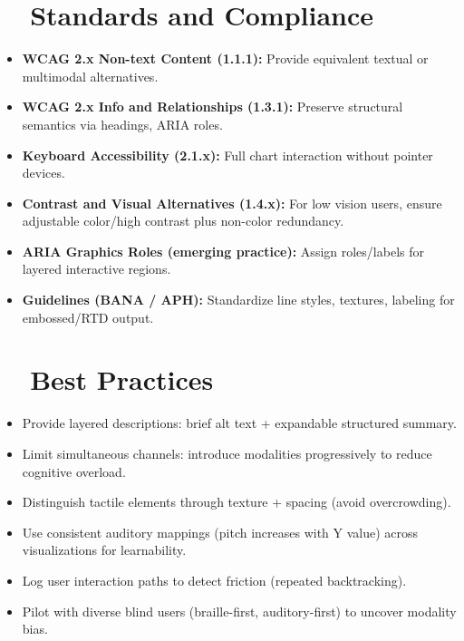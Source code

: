 \section{~~Standards and Compliance}\label{ch13:sec:standards-compliance}
\begin{itemize}
	\item \textbf{WCAG 2.x Non-text Content (1.1.1):} Provide equivalent textual or multimodal alternatives\supercite{WCAG21LevelAA}.
	\item \textbf{WCAG 2.x Info and Relationships (1.3.1):} Preserve structural semantics via headings, ARIA roles.
	\item \textbf{Keyboard Accessibility (2.1.x):} Full chart interaction without pointer devices.
	\item \textbf{Contrast and Visual Alternatives (1.4.x):} For low vision users, ensure adjustable color/high contrast plus non-color redundancy\supercite{ContrastChecker}.
	\item \textbf{ARIA Graphics Roles (emerging practice):} Assign roles/labels for layered interactive regions.
	\item \textbf{ Guidelines (BANA / APH):} Standardize line styles, textures, labeling for embossed/RTD output\supercite{CreatingTactileGraphics}.
\end{itemize}

\section{~~Best Practices}\label{ch13:sec:best-practices}
\begin{itemize}
	\item Provide layered descriptions: brief alt text + expandable structured summary.
	\item Limit simultaneous channels: introduce modalities progressively to reduce cognitive overload.
	\item Distinguish tactile elements through texture + spacing (avoid overcrowding).
	\item Use consistent auditory mappings (pitch increases with Y value) across visualizations for learnability.
	\item Log user interaction paths to detect  friction (repeated backtracking).
	\item Pilot with diverse blind users (braille-first, auditory-first) to uncover modality bias.
\end{itemize}

